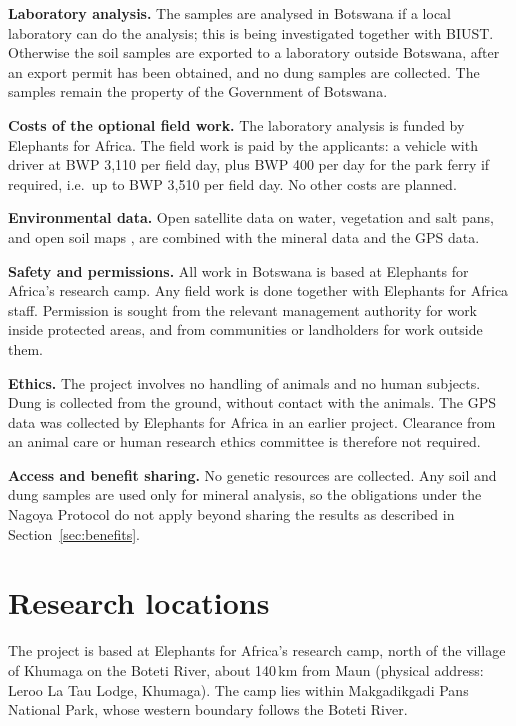 \documentclass[12pt,a4paper]{article}
\begin{document}
\textbf{Laboratory analysis.} The samples are analysed in Botswana if a local laboratory can do the analysis; this is being investigated together with BIUST. Otherwise the soil samples are exported to a laboratory outside Botswana, after an export permit has been obtained, and no dung samples are collected. The samples remain the property of the Government of Botswana.

\textbf{Costs of the optional field work.} The laboratory analysis is funded by Elephants for Africa. The field work is paid by the applicants: a vehicle with driver at BWP 3,110 per field day, plus BWP 400 per day for the park ferry if required, i.e.\ up to BWP 3,510 per field day. No other costs are planned.

\textbf{Environmental data.} Open satellite data on water, vegetation and salt pans, and open soil maps \cite{hengl}, are combined with the mineral data and the GPS data.

\textbf{Safety and permissions.} All work in Botswana is based at Elephants for Africa's research camp. Any field work is done together with Elephants for Africa staff. Permission is sought from the relevant management authority for work inside protected areas, and from communities or landholders for work outside them.

\textbf{Ethics.} The project involves no handling of animals and no human subjects. Dung is collected from the ground, without contact with the animals. The GPS data was collected by Elephants for Africa in an earlier project. Clearance from an animal care or human research ethics committee is therefore not required.

\textbf{Access and benefit sharing.} No genetic resources are collected. Any soil and dung samples are used only for mineral analysis, so the obligations under the Nagoya Protocol do not apply beyond sharing the results as described in Section~\ref{sec:benefits}.

\section{Research locations}

The project is based at Elephants for Africa's research camp, north of the village of Khumaga on the Boteti River, about 140\,km from Maun (physical address: Leroo La Tau Lodge, Khumaga). The camp lies within Makgadikgadi Pans National Park, whose western boundary follows the Boteti River.
\end{document}
